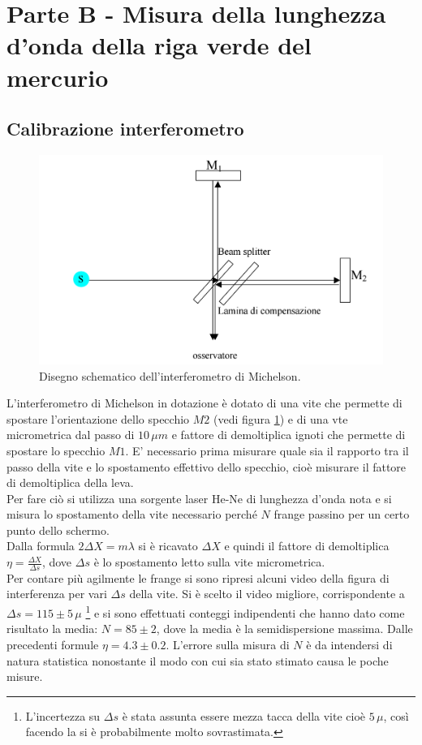 \documentclass[10pt,a4paper]{article}
\begin{document}
\section{Parte B - Misura della lunghezza d'onda della riga verde del mercurio}
\subsection{Calibrazione interferometro}

\begin{figure}[!htb]
  \centering
  \includegraphics[scale=.5]{interferometro.png}
\caption{Disegno schematico dell'interferometro di Michelson.}
\label{int}
\end{figure}

L'interferometro di Michelson in dotazione è dotato di una vite che permette di spostare l'orientazione dello specchio $M2$ (vedi figura \ref{int}) e di una vte micrometrica dal passo di $10 \, \mu m$ e fattore di demoltiplica ignoti che permette di spostare lo specchio $M1$. E' necessario prima misurare quale sia il rapporto tra il passo della vite e lo spostamento effettivo dello specchio, cioè misurare il fattore di demoltiplica della leva. \\
Per fare ciò si utilizza una sorgente laser He-Ne di lunghezza d'onda nota e si misura lo spostamento della vite necessario perché $N$ frange passino per un certo punto dello schermo. \\
Dalla formula $2 \Delta X = m \lambda$ si è ricavato $\Delta X$ e quindi il fattore di demoltiplica $\eta = \frac{\Delta X}{\Delta s}$, dove $\Delta s$ è lo spostamento letto sulla vite micrometrica.\\
Per contare più agilmente le frange si sono ripresi alcuni video della figura di interferenza per vari $\Delta s$ della vite. Si è scelto il video migliore, corrispondente a $\Delta s = 115 \pm 5 \, \mu $ \footnote{L'incertezza su $\Delta s$ è stata assunta essere mezza tacca della vite cioè $5 \, \mu$, così facendo la si è probabilmente molto sovrastimata.} e si sono effettuati conteggi indipendenti che hanno dato come risultato la media: $N = 85 \pm 2$, dove la media è la semidispersione massima. Dalle precedenti formule $\eta = 4.3 \pm 0.2$. L'errore sulla misura di $N$ è da intendersi di natura statistica nonostante il modo con cui sia stato stimato causa le poche misure.\\
\end{document}
